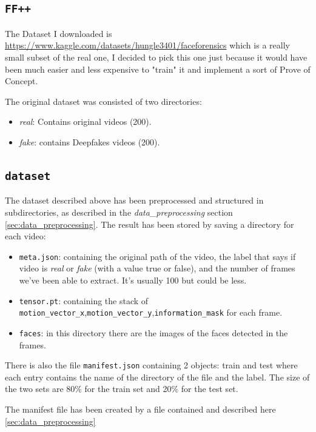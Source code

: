 \documentclass[a4paper,12pt]{article}
\begin{document}
\subsection{\texttt{FF++}}
The Dataset I downloaded is \href{https://www.kaggle.com/datasets/hungle3401/faceforensics}{https://www.kaggle.com/datasets/hungle3401/faceforensics} which is a really small subset of the real one, I decided to pick this one just because it would have been much easier and less expensive to "train" it and implement a sort of Prove of Concept. 

The original dataset was consisted of two directories: 
\begin{itemize}
    \item \emph{real}: Contains original videos (200). 
    \item \emph{fake}: contains Deepfakes videos (200).  
\end{itemize}

\subsection{\texttt{dataset}}
The dataset described above has been preprocessed and structured in subdirectories, as described in the \emph{data\_preprocessing} section \ref{sec:data_preprocessing}. The result has been stored by saving a directory for each video:
\begin{itemize}
  \item \texttt{meta.json}: containing the original path of the video, the label that says if video is \emph{real} or \emph{fake} (with a value true or false), and the number of frames we've been able to extract. It's usually 100 but could be less. 
  \item \texttt{tensor.pt}: containing the stack of \texttt{motion\_vector\_x},\texttt{motion\_vector\_y},\texttt{information\_mask} for each frame.
  \item \texttt{faces}: in this directory there are the images of the faces detected in the frames.
\end{itemize}

There is also the file \texttt{manifest.json} containing 2 objects: train and test where each entry contains the name of the directory of the file and the label. The size of the two sets are 80\% for the train set and 20\% for the test set. 

The manifest file has been created by a file contained and described here \ref{sec:data_preprocessing}
\end{document}
